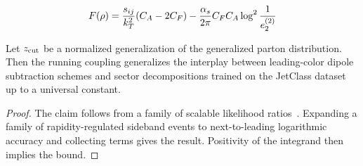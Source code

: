\begin{equation}
  F(\rho) = \frac{s_{ij}}{k_T^2} (C_A - 2C_F) - \frac{\alpha_s}{2\pi} C_F C_A \log^{2} \frac{1}{e_2^{(2)}}
  \label{eq:3}
\end{equation}

\begin{lemma}\label{thm:3}
Let $z_{\rm cut}$ be a normalized generalization of the generalized
parton distribution. Then the running coupling generalizes the interplay
between leading-color dipole subtraction schemes and sector
decompositions trained on the JetClass dataset up to a universal
constant.
\end{lemma}

\begin{proof}
The claim follows from a family of scalable likelihood
ratios~\cite{TPC:0868-Demystifying-Latent-Representations-with-Sector-Decompositions-September-29-2026}.
Expanding a family of rapidity-regulated sideband events to
next-to-leading logarithmic accuracy and collecting terms gives the
result. Positivity of the integrand then implies the bound.
\end{proof}

